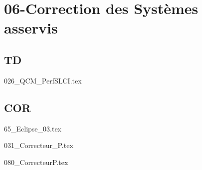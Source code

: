 \clearpage
\chapter{06-Correction des Systèmes asservis}

\section{TD}

\setcounter{question}{0}
{}
\graphicspath{{../06-Correction des Systèmes asservis/TD/026_QCM_PerfSLCI/images/}{../06-Correction des Systèmes asservis/TD/026_QCM_PerfSLCI/}{../Style/png/}}
{026_QCM_PerfSLCI.tex}

\section{COR}

\setcounter{question}{0}
{}
\graphicspath{{../06-Correction des Systèmes asservis/TD/COR/AP/65_Eclipse_03/images/}{../06-Correction des Systèmes asservis/TD/COR/AP/65_Eclipse_03/}{../Style/png/}}
{65_Eclipse_03.tex}

\setcounter{question}{0}
{}
\graphicspath{{../06-Correction des Systèmes asservis/TD/COR/P/031_Correcteur_P/images/}{../06-Correction des Systèmes asservis/TD/COR/P/031_Correcteur_P/}{../Style/png/}}
{031_Correcteur_P.tex}

\setcounter{question}{0}
{}
\graphicspath{{../06-Correction des Systèmes asservis/TD/COR/P/080_CorrecteurP/images/}{../06-Correction des Systèmes asservis/TD/COR/P/080_CorrecteurP/}{../Style/png/}}
{080_CorrecteurP.tex}

